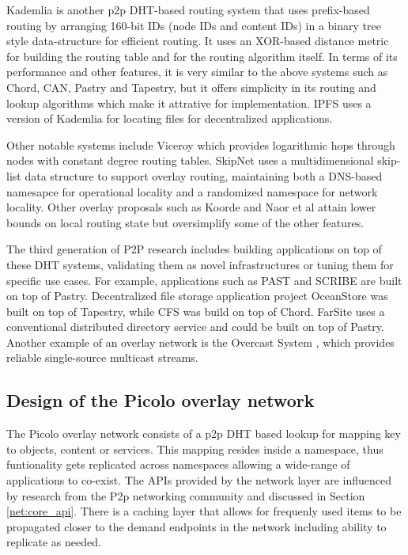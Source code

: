 Kademlia \cite{kademlia} is another p2p DHT-based routing system that uses prefix-based routing by arranging 160-bit IDs
(node IDs and content IDs) in a binary tree style data-structure for efficient routing. It uses an XOR-based distance
metric for building the routing table and for the routing algorithm itself. In terms of its performance and other
features, it is very similar to the above systems such as Chord, CAN, Pastry and Tapestry, but it offers simplicity in
its routing and lookup algorithms which make it attrative for implementation. IPFS \cite{ipfs} uses a version of
Kademlia for locating files for decentralized applications.

Other notable systems include Viceroy \cite{viceroy} which provides logarithmic hops through nodes with constant degree
routing tables. SkipNet \cite{skipnet} uses a multidimensional skip-list data structure to support overlay routing,
maintaining both a DNS-based namesapce for operational locality and a randomized namespace for network locality. Other
overlay proposals such as Koorde \cite{koorde} and Naor et al \cite{simple_hash} attain lower bounds on local routing
state but oversimplify some of the other features. 

The third generation of P2P research includes building applications on top of these DHT systems, validating them as
novel infrastructures or tuning them for specific use cases. For example, applications such as PAST \cite{past} and
SCRIBE \cite{scribe} are built on top of Pastry. Decentralized file storage application project OceanStore \cite{oceanstore} was built
on top of Tapestry, while CFS \cite{cfs} was build on top of Chord. FarSite \cite{farsite} uses a conventional
distributed directory service and could be built on top of Pastry. Another example of an overlay network is the Overcast
System \cite{overcast}, which provides reliable single-source multicast streams.

\subsection{Design of the Picolo overlay network}
\label{net:design}

The Picolo overlay network consists of a p2p DHT based lookup for mapping key to objects, content or services. This
mapping resides inside a namespace, thus funtionality gets replicated across namespaces allowing a wide-range of
applications to co-exist. The APIs provided by the network layer are influenced by research from the P2p networking
community and discussed in Section \ref{net:core_api}.  There is a caching layer that allows for frequenly used items to
be propagated closer to the demand endpoints in the network including ability to replicate as needed.

